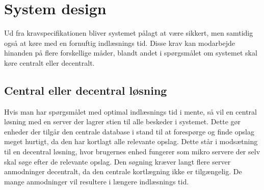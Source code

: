 \section{System design}
Ud fra kravspecifikationen bliver systemet pålagt at være sikkert, men samtidig også at køre med en fornuftig indlæsnings tid. Disse krav kan  modarbejde hinanden på flere forskellige måder, blandt andet i spørgsmålet om systemet skal køre centralt eller decentralt.

\subsection{Central eller decentral løsning}
Hvis man har spørgsmålet med optimal indlæsnings tid i mente, så vil en central løsning med en server der lagrer stien til alle beskeder i systemet. Dette gør enheder der tilgår den centrale database i stand til at forespørge og finde opslag meget hurtigt, da den har kortlagt alle relevante opslag. Dette står i modsætning til en decentral løsning, hvor brugernes enhed fungerer som mikro servere der selv skal søge efter de relevante opslag. Den søgning kræver langt flere server anmodninger decentralt, da den centrale kortlægning ikke er tilgængelig. De mange anmodninger vil resultere i længere indlæsnings tid.

